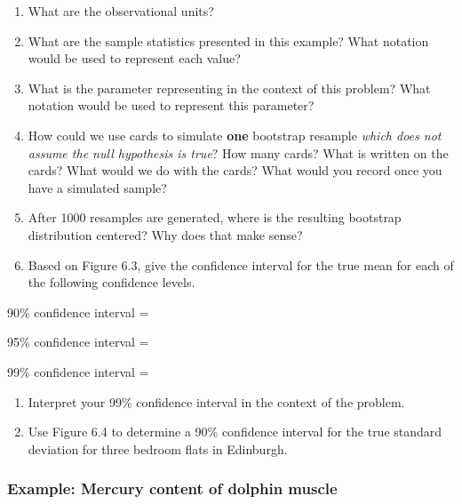 \documentclass[
]{report}
\newcommand{\rgs}{\vspace{12pt}} %
\newcommand{\rgi}{\hspace{24pt}}  %
\begin{document}
\begin{enumerate}
\def\labelenumi{\arabic{enumi}.}
\item
  What are the observational units?
  \rgs 
\item
  What are the sample statistics presented in this example? What notation would be used to represent each value?
  \rgs 
\item
  What is the parameter representing in the context of this problem? What notation would be used to represent this parameter?
  \rgs 
  \rgs 
\item
  How could we use cards to simulate \textbf{one} bootstrap resample \emph{which does not assume the null hypothesis is true}? How many cards? What is written on the cards? What would we do with the cards? What would you record once you have a simulated sample?
  \rgs 
  \rgs 
  \rgs 
\item
  After 1000 resamples are generated, where is the resulting bootstrap distribution centered? Why does that make sense?
  \rgs 
  \rgs 
\item
  Based on Figure 6.3, give the confidence interval for the true mean for each of the following confidence levels.
\end{enumerate}

\rgi 90\% confidence interval =
\rgs 

\rgi 95\% confidence interval =
\rgs 

\rgi 99\% confidence interval =
\rgs 

\begin{enumerate}
\def\labelenumi{\arabic{enumi}.}
\setcounter{enumi}{6}
\item
  Interpret your 99\% confidence interval in the context of the problem.
  \rgs 
  \rgs 
\item
  Use Figure 6.4 to determine a 90\% confidence interval for the true standard deviation for three bedroom flats in Edinburgh.
  \rgs 
\end{enumerate}

\hypertarget{example-mercury-content-of-dolphin-muscle}{%
\subsubsection*{Example: Mercury content of dolphin muscle}\label{example-mercury-content-of-dolphin-muscle}}
\end{document}
